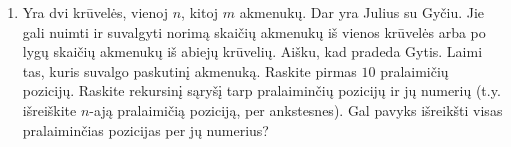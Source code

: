 \begin{enumerate}
  \item Yra dvi krūvelės, vienoj $n$, kitoj $m$ akmenukų. Dar yra Julius su Gyčiu.
    Jie gali nuimti ir suvalgyti norimą skaičių akmenukų iš vienos krūvelės arba po lygų
    skaičių akmenukų iš abiejų krūvelių. Aišku, kad pradeda Gytis. Laimi tas, kuris
    suvalgo paskutinį akmenuką. Raskite pirmas $10$ pralaimičių pozicijų. Raskite
    rekursinį sąryšį tarp pralaiminčių pozicijų ir jų numerių (t.y. išreiškite
    $n$-ają pralaimičią poziciją, per ankstesnes). Gal pavyks išreikšti visas
    pralaiminčias pozicijas per jų numerius?

\end{enumerate}
